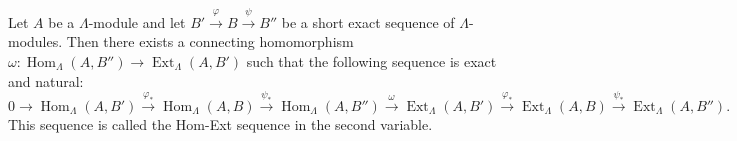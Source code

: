 Let $A$ be a $\Lambda$-module and let $B' \xrightarrow{\varphi} B \xrightarrow{\psi} B''$ be a short exact sequence of $\Lambda$-modules. Then there exists a connecting homomorphism $\omega : \operatorname{Hom}_\Lambda(A, B'') \to \operatorname{Ext}_\Lambda(A, B')$ such that the following sequence is exact and natural:
$$
0 \to \operatorname{Hom}_\Lambda(A, B') \xrightarrow{\varphi_*} \operatorname{Hom}_\Lambda(A, B) \xrightarrow{\psi_*} \operatorname{Hom}_\Lambda(A, B'') \xrightarrow{\omega} \operatorname{Ext}_\Lambda(A, B') \xrightarrow{\varphi_*} \operatorname{Ext}_\Lambda(A, B) \xrightarrow{\psi_*} \operatorname{Ext}_\Lambda(A, B'').
$$
This sequence is called the Hom-Ext sequence in the second variable.
